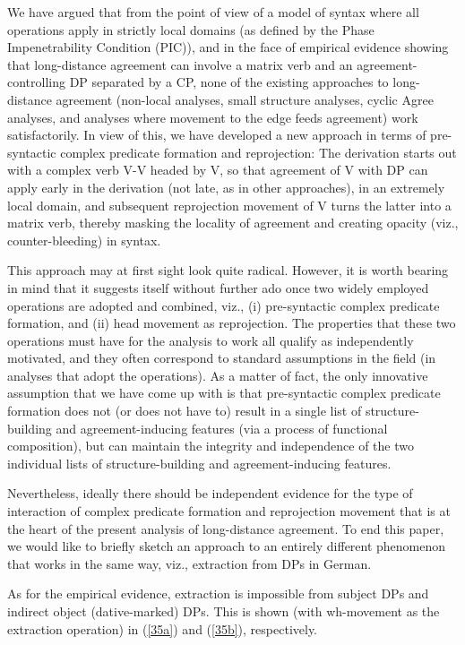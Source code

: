 \documentclass[output=paper
,modfonts
,nonflat]{langsci/langscibook}
\begin{document}
	We have argued that from the point of view of a model of syntax where
	all operations apply in strictly local domains (as defined by the
	Phase Impenetrability Condition (PIC)), and in the face of empirical
	evidence showing that long-distance agreement can involve a matrix
	verb and an agreement-controlling DP separated by a CP, none of the
	existing approaches to long-distance agreement (non-local analyses,
	small structure analyses, cyclic Agree analyses, and analyses where
	movement to the edge feeds agreement) work satisfactorily. In view of
	this, we have developed a new approach in terms of pre-syntactic
	complex predicate formation and reprojection: The derivation starts
	out with a complex verb {V-V} headed by V, so that agreement
	of V with DP can apply early in the derivation (not late, as in
	other approaches), in an extremely local domain, and subsequent
	reprojection movement of V turns the latter into a matrix verb, thereby
	masking the locality of agreement and creating opacity (viz.,
	counter-bleeding) in syntax.  
	
	This approach may at first sight look quite radical. However, it is
	worth bearing in mind that it suggests itself without further ado once
	two widely employed operations are adopted and combined, viz., (i)
	pre-syntactic complex predicate formation, and (ii) head movement as
	reprojection. The properties that these two operations must have for
	the analysis to work all qualify as independently motivated, and they
	often correspond to standard assumptions in the field (in analyses
	that adopt the operations). As a matter of fact, the only innovative
	assumption that we have come up with is that pre-syntactic complex
	predicate formation does not (or does not have to) result in a single
	list of structure-building and agreement-inducing features (via a
	process of functional composition), but can maintain the integrity and
	independence of the two individual lists of structure-building and
	agreement-inducing features.
	
	Nevertheless, ideally there should be independent evidence for the
	type of interaction of complex predicate formation and reprojection
	movement that is at the heart of the present analysis of long-distance
	agreement. To end this paper, we would like to briefly sketch an
	approach to an entirely different phenomenon that works in the same
	way, viz., extraction from DPs in German. 
	
	As for the empirical evidence, extraction is impossible from subject
	DPs and indirect object (dative-marked) DPs. This is shown (with
	wh-movement as the extraction operation) in (\ref{35a}) and (\ref{35b}),
	respectively.
	
\end{document}
